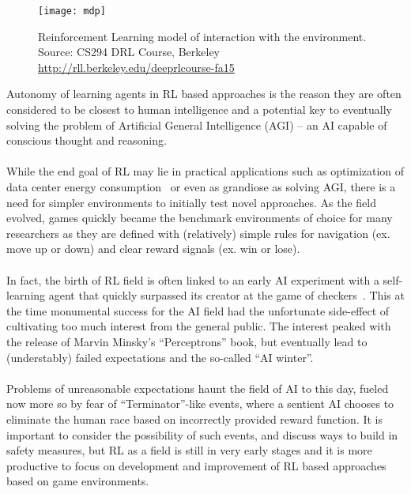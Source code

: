 \begin{figure}[ht]
\begin{center}
\texttt{[image: mdp]}
\caption[]{Reinforcement Learning model of interaction with the environment.\\\small{Source: CS294 DRL Course, Berkeley \url{http://rll.berkeley.edu/deeprlcourse-fa15} } }
\label{fig:mdp}
\end{center}
\end{figure}

\noindent Autonomy of learning agents in RL based approaches is the reason they are often considered to be closest to human intelligence and a potential key to eventually solving the problem of Artificial General Intelligence (AGI) -- an AI capable of conscious thought and reasoning.
\\\\
While the end goal of RL may lie in practical applications such as optimization of data center energy consumption~\cite{Gao2014} or even as grandiose as solving AGI, there is a need for simpler environments to initially test novel approaches. 
As the field evolved, games quickly became the benchmark environments of choice for many researchers as they are defined with (relatively) simple rules for navigation (ex. move up or down) and clear reward signals (ex. win or lose). 
\\\\
In fact, the birth of RL field is often linked to an early AI experiment with a self-learning agent that quickly surpassed its creator at the game of checkers~\cite{Samuel1959}. This at the time monumental success for the AI field had the unfortunate side-effect of cultivating too much interest from the general public. The interest peaked with the release of Marvin Minsky's ``Perceptrons'' book, but eventually lead to (understably) failed expectations and the so-called ``AI winter''.
\\\\
Problems of unreasonable expectations haunt the field of AI to this day, fueled now more so by fear of ``Terminator''-like events, where a sentient AI chooses to eliminate the human race based on incorrectly provided reward function. It is important to consider the possibility of such events, and discuss ways to build in safety measures, but RL as a field is still in very early stages and it is more productive to focus on development and improvement of RL based approaches based on game environments.
\\\\
